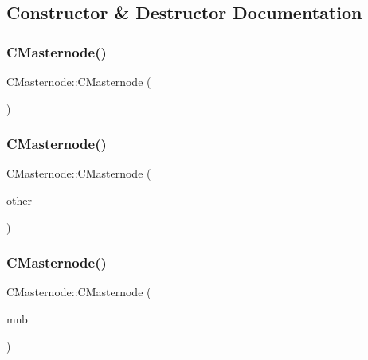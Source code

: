 \subsection{Constructor \& Destructor Documentation}
\mbox{\label{class_c_masternode_a9783a33543d5d7b5f7101f3196562276}} 
\subsubsection{\texorpdfstring{C\+Masternode()}{CMasternode()}\hspace{0.1cm}{\footnotesize\ttfamily [1/4]}}
{\footnotesize\ttfamily C\+Masternode\+::\+C\+Masternode (\begin{DoxyParamCaption}{ }\end{DoxyParamCaption})}

\mbox{\label{class_c_masternode_a45ddf472ea17b5393060b648a1e25291}} 
\subsubsection{\texorpdfstring{C\+Masternode()}{CMasternode()}\hspace{0.1cm}{\footnotesize\ttfamily [2/4]}}
{\footnotesize\ttfamily C\+Masternode\+::\+C\+Masternode (\begin{DoxyParamCaption}\item[{const \mbox{\hyperlink{class_c_masternode}{C\+Masternode}} \&}]{other }\end{DoxyParamCaption})}

\mbox{\label{class_c_masternode_a627dbc7dfeaa9a996bcf7fac3665933b}} 
\subsubsection{\texorpdfstring{C\+Masternode()}{CMasternode()}\hspace{0.1cm}{\footnotesize\ttfamily [3/4]}}
{\footnotesize\ttfamily C\+Masternode\+::\+C\+Masternode (\begin{DoxyParamCaption}\item[{const \mbox{\hyperlink{class_c_masternode_broadcast}{C\+Masternode\+Broadcast}} \&}]{mnb }\end{DoxyParamCaption})}

